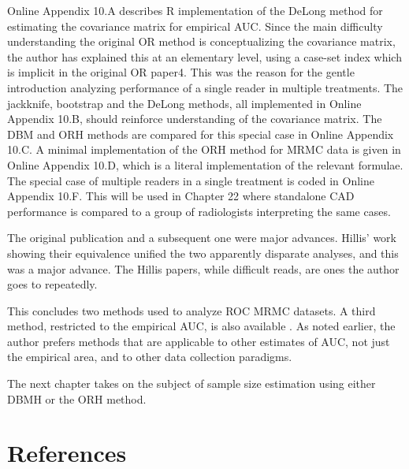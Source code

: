 \documentclass[
]{book}
\begin{document}
Online Appendix 10.A describes R implementation of the DeLong method for estimating the covariance matrix for empirical AUC. Since the main difficulty understanding the original OR method is conceptualizing the covariance matrix, the author has explained this at an elementary level, using a case-set index which is implicit in the original OR paper4. This was the reason for the gentle introduction analyzing performance of a single reader in multiple treatments. The jackknife, bootstrap and the DeLong methods, all implemented in Online Appendix 10.B, should reinforce understanding of the covariance matrix. The DBM and ORH methods are compared for this special case in Online Appendix 10.C. A minimal implementation of the ORH method for MRMC data is given in Online Appendix 10.D, which is a literal implementation of the relevant formulae. The special case of multiple readers in a single treatment is coded in Online Appendix 10.F. This will be used in Chapter 22 where standalone CAD performance is compared to a group of radiologists interpreting the same cases.

The original publication \citep{RN204} and a subsequent one \citep{RN1450} were major advances. Hillis' work showing their equivalence unified the two apparently disparate analyses, and this was a major advance. The Hillis papers, while difficult reads, are ones the author goes to repeatedly.

This concludes two methods used to analyze ROC MRMC datasets. A third method, restricted to the empirical AUC, is also available \citep{RN2253, RN2254, RN2080, RN2081}. As noted earlier, the author prefers methods that are applicable to other estimates of AUC, not just the empirical area, and to other data collection paradigms.

The next chapter takes on the subject of sample size estimation using either DBMH or the ORH method.

\hypertarget{references}{%
\section{References}\label{references}}

  
\end{document}
